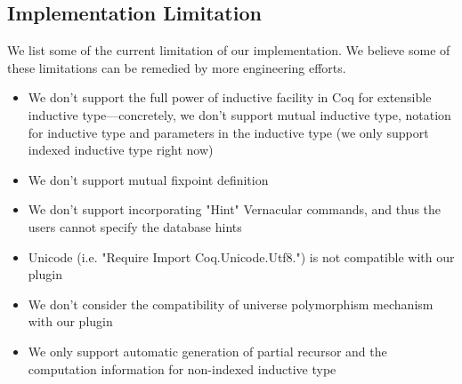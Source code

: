 

\subsection{Implementation Limitation}
We list some of the current limitation of our implementation. We believe some of these limitations can be remedied by more engineering efforts.
\begin{itemize}
  \item We don't support the full power of inductive facility in Coq for extensible inductive type---concretely, we don't support mutual inductive type, notation for inductive type and parameters in the inductive type (we only support indexed inductive type right now)
  \item We don't support mutual fixpoint definition
  \item We don't support incorporating "Hint" Vernacular commands, and thus the users cannot specify the database hints
  \item Unicode (i.e. "Require Import Coq.Unicode.Utf8.") is not compatible with our plugin 
  \item We don't consider the compatibility of universe polymorphism mechanism with our plugin
  \item We only support automatic generation of partial recursor and the computation information for non-indexed inductive type 
\end{itemize}

\fi